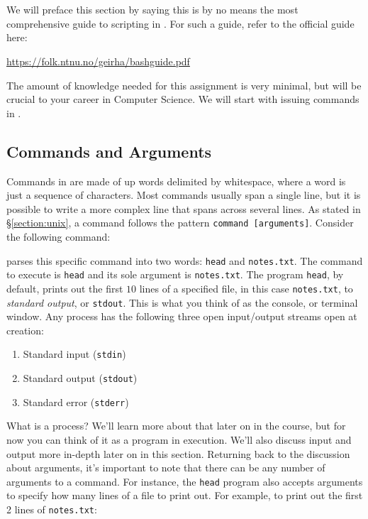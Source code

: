 \section{\Bash{}}\label{section:bash}

We will preface this section by saying this is by no means the most
comprehensive guide to scripting in \Bash{}. For such a guide, refer to
the official \Bash{} guide here:

\centerline{\url{https://folk.ntnu.no/geirha/bashguide.pdf}}

The amount of \Bash{} knowledge needed for this assignment is very minimal, but
will be crucial to your career in Computer Science. We will start with issuing
commands in \Bash{}.

\subsection{Commands and Arguments}

Commands in \Bash{} are made of up words delimited by whitespace, where a word is
just a sequence of characters. Most commands usually span a single line, but it
is possible to write a more complex line that spans across several lines. As
stated in \S\ref{section:unix}, a command follows the pattern \texttt{command
[arguments]}. Consider the following command:


\Bash{} parses this specific command into two words: \texttt{head} and
\texttt{notes.txt}. The command to execute is \texttt{head} and its sole
argument is \texttt{notes.txt}. The program \texttt{head}, by default, prints
out the first $10$ lines of a specified file, in this case \texttt{notes.txt},
to \emph{standard output}, or \texttt{stdout}. This is what you think of as the
console, or terminal window. Any \Unix{} process has the following three open
input/output streams open at creation:

\begin{enumerate}
  \item Standard input (\texttt{stdin})
  \item Standard output (\texttt{stdout})
  \item Standard error (\texttt{stderr})
\end{enumerate}

What is a \Unix{} process? We'll learn more about that later on in the course,
but for now you can think of it as a program in execution. We'll also discuss
input and output more in-depth later on in this section. Returning back to the
discussion about arguments, it's important to note that there can be any number
of arguments to a command. For instance, the \texttt{head} program also accepts
arguments to specify how many lines of a file to print out. For example, to
print out the first 2 lines of \texttt{notes.txt}:

